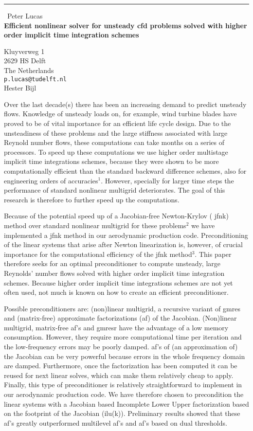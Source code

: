 \documentclass{report}
\begin{document}
\begin{center}
\rule{6in}{1pt} \
{\large Peter Lucas \\
{\bf Efficient nonlinear solver for unsteady {\sc cfd} problems solved with higher order implicit time integration schemes}}

Kluyverweg 1 \\ 2629 HS Delft \\ The Netherlands
\\
{\tt p.lucas@tudelft.nl}\\
Hester Bijl\end{center}

Over the last decade(s) there has been an increasing demand to predict
unsteady flows. Knowledge of unsteady loads on, for example, wind turbine
blades have proved to be of vital importance for an efficient life cycle
design. Due to the unsteadiness of these problems and the large stiffness
associated with large Reynold number flows, these computations can take
months on a series of processors. To speed up these computations we use
higher order multistage implicit time integrations schemes, because they
were shown to be more computationally efficient than the standard
backward difference schemes, also for engineering orders of
accuracies$^1$. However, specially for larger time steps the performance
of standard nonlinear multigrid deteriorates. The goal of this research
is therefore to further speed up the computations.

Because of the potential speed up of a Jacobian-free Newton-Krylov ({\sc
jfnk}) method over standard nonlinear multigrid for these problems$^2$ we
have implemented a {\sc jfnk} method in our aerodynamic production code.
Preconditioning of the linear systems that arise after Newton
linearization is, however, of crucial importance for the computational
efficiency of the {\sc jfnk} method$^3$. This paper therefore seeks for
an optimal preconditioner to compute unsteady, large Reynolds' number
flows solved with higher order implicit time integration schemes. Because
higher order implicit time integrations schemes are not yet often used,
not much is known on how to create an efficient preconditioner.

Possible preconditioners are: (non)linear multigrid, a recursive variant
of {\sc gmres} and (matrix-free) approximate factorizations ({\sc af}) of
the Jacobian. (Non)linear multigrid, matrix-free {\sc af}'s and {\sc
gmresr} have the advantage of a low memory consumption. However, they
require more computational time per iteration and the low-frequency
errors may be poorly damped. {\sc af}'s of (an approximation of) the
Jacobian can be very powerful because errors in the whole frequency
domain are damped. Furthermore, once the factorization has been computed
it can be reused for next linear solves, which can make them relatively
cheap to apply. Finally, this type of preconditioner is relatively
straightforward to implement in our aerodynamic production code. We have
therefore chosen to precondition the linear systems with a Jacobian based
Incomplete Lower Upper factorization based on the footprint of the
Jacobian ({\sc ilu}(k)). Preliminary results showed that these {\sc af}'s
greatly outperformed multilevel {\sc af}'s and {\sc af}'s based on dual
thresholds.
\end{document}
